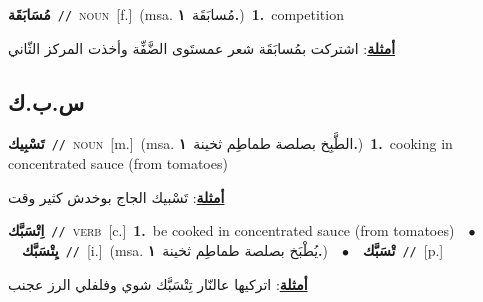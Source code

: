 \documentclass[10pt,a4paper,twoside]{article} %
\begin{document}
\begin{multicols}{2}
{{{{{{{{{{\setlength\topsep{0pt}\textbf{\foreignlanguage{arabic}{مُسَابَقَة}}\ {\color{gray}\texttt{//}\color{black}}\ \textsc{noun}\ [f.]\ \color{gray}(msa. \foreignlanguage{arabic}{مُسابَقَة}~\foreignlanguage{arabic}{\textbf{١.}})\color{black}\ \textbf{1.}~competition\  \begin{flushright}\color{gray}\foreignlanguage{arabic}{\textbf{\underline{\foreignlanguage{arabic}{أمثلة}}}: اشتركت بمُسابَقَة شعر عمستَوى الضَّفِّة وأخذت المركز الثّاني}\end{flushright}\color{black}} \vspace{2mm}

\vspace{-3mm}
\subsection*{\color{blue}\foreignlanguage{arabic}{س.ب.ك}\color{blue}{}} 

{\setlength\topsep{0pt}\textbf{\foreignlanguage{arabic}{تَسْبِيك}}\ {\color{gray}\texttt{//}\color{black}}\ \textsc{noun}\ [m.]\ \color{gray}(msa. \foreignlanguage{arabic}{الطَّبِخ بصلصة طماطِم ثخينة}~\foreignlanguage{arabic}{\textbf{١.}})\color{black}\ \textbf{1.}~cooking in concentrated sauce (from tomatoes)\  \begin{flushright}\color{gray}\foreignlanguage{arabic}{\textbf{\underline{\foreignlanguage{arabic}{أمثلة}}}: تَسْبيك الجاج بوخدش كثير وقت}\end{flushright}\color{black}} \vspace{2mm}

{\setlength\topsep{0pt}\textbf{\foreignlanguage{arabic}{اِتْسَبَّك}}\ {\color{gray}\texttt{//}\color{black}}\ \textsc{verb}\ [c.]\ \textbf{1.}~be cooked in concentrated sauce (from tomatoes)\ \ $\bullet$\ \ \setlength\topsep{0pt}\textbf{\foreignlanguage{arabic}{يِتْسَبَّك}}\ {\color{gray}\texttt{//}\color{black}}\ [i.]\ \color{gray}(msa. \foreignlanguage{arabic}{يُطْبَخ بصلصة طماطِم ثخينة}~\foreignlanguage{arabic}{\textbf{١.}})\color{black}\ \ $\bullet$\ \ \setlength\topsep{0pt}\textbf{\foreignlanguage{arabic}{تْسَبَّك}}\ {\color{gray}\texttt{//}\color{black}}\ [p.]\  \begin{flushright}\color{gray}\foreignlanguage{arabic}{\textbf{\underline{\foreignlanguage{arabic}{أمثلة}}}: اتركيها عالنّار تِتْسَبَّك شوي وفلفلي الرز عجنب}\end{flushright}\color{black}} \vspace{2mm}

}}}}}}}}}
\end{multicols}
\end{document}
